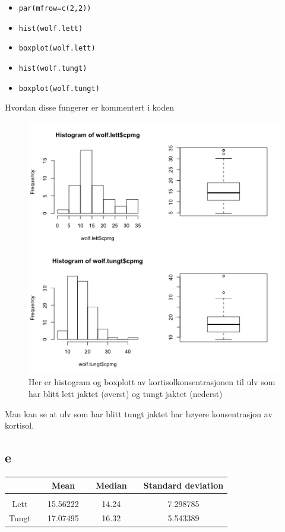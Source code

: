 \begin{itemize}
    \item \texttt{par(mfrow=c(2,2))}
    \item \texttt{hist(wolf.lett)}
    \item \texttt{boxplot(wolf.lett)}
    \item \texttt{hist(wolf.tungt)}
    \item \texttt{boxplot(wolf.tungt)}
\end{itemize}
Hvordan disse fungerer er kommentert i koden
\begin{figure}[H]
		\centering
		\includegraphics[width=0.9\linewidth]{wolf_sammenlign.pdf}
		\caption{Her er histogram og boxplott av kortisolkonsentrasjonen til ulv som har blitt lett jaktet (øverst) og tungt jaktet (nederst)}
		\label{fig:sammenlign}
\end{figure}
Man kan se at ulv som har blitt tungt jaktet har høyere konsentrasjon av kortisol.

\subsection*{e}

\begin{center}
\label{tab:mean_median_standard}
\begin{tabularx}{\textwidth}{c X c X c X c }
    \hline
    \hline
         && Mean && Median && Standard deviation \\
    \hline
    \\
        Lett   	&&     15.56222      &&      14.24      &&     7.298785       \\
        Tungt   &&     17.07495      &&      16.32      &&      5.543389       \\
    \hline
\end{tabularx}
\end{center}


